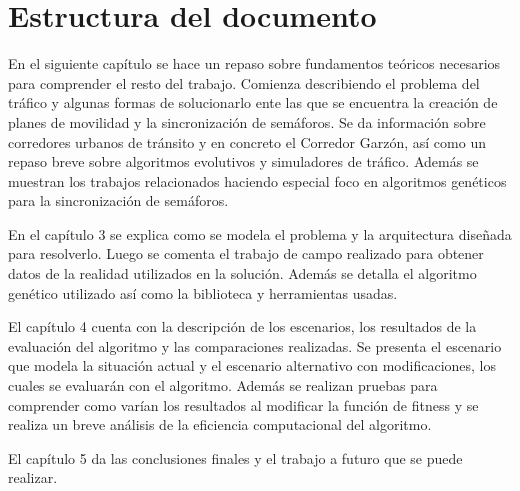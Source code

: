 \section{Estructura del documento}
En el siguiente capítulo se hace un repaso sobre fundamentos teóricos necesarios para comprender el resto del trabajo. Comienza describiendo el problema del tráfico y algunas formas de solucionarlo ente las que se encuentra la creación de planes de movilidad y la sincronización de semáforos. Se da información sobre corredores urbanos de tránsito y en concreto el Corredor Garzón, así como un repaso breve sobre algoritmos evolutivos y simuladores de tráfico. Además se muestran los trabajos relacionados haciendo especial foco en algoritmos genéticos para la sincronización de semáforos.

En el capítulo 3 se explica como se modela el problema y la arquitectura diseñada  para resolverlo. Luego se comenta el trabajo de campo realizado para obtener datos de la realidad utilizados en la solución. Además se detalla el algoritmo genético utilizado así como la biblioteca y herramientas usadas.

El capítulo 4 cuenta con la descripción de los escenarios, los resultados de la evaluación del algoritmo y las comparaciones realizadas. Se presenta el escenario que modela la situación actual y el escenario alternativo con modificaciones, los cuales se evaluarán con el algoritmo. Además se realizan pruebas para comprender como varían los resultados al modificar la función de fitness y se realiza un breve análisis de la eficiencia computacional del algoritmo.

El capítulo 5 da las conclusiones finales y el trabajo a futuro que se puede realizar.






